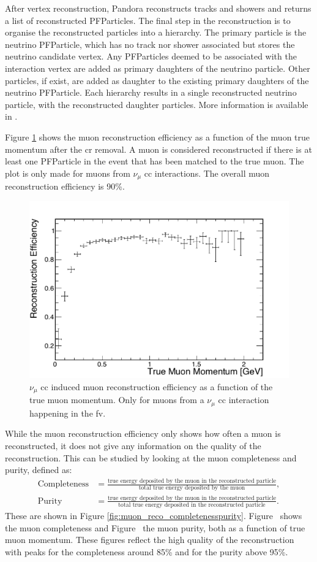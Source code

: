 After vertex reconstruction, Pandora reconstructs tracks and showers and returns a list of reconstructed PFParticles. The final step in the \pn reconstruction is to organise the reconstructed particles into a hierarchy. The primary particle is the neutrino PFParticle, which has no track nor shower associated but stores the neutrino candidate vertex.
Any PFParticles deemed to be associated with the interaction vertex are added as primary daughters of the neutrino particle. Other particles, if exist, are added as daughter to the existing primary daughters of the neutrino PFParticle.
Each hierarchy results in a single reconstructed neutrino particle, with the reconstructed daughter particles. More information is available in \cite{pandora}.

Figure \ref{fig:muon_reco_eff} shows the muon reconstruction efficiency as a function of the muon true momentum after the \acrshort{cr} removal. A muon is considered reconstructed if there is at least one PFParticle in the event that has been matched to the true muon. The plot is only made for muons from $\nu_\mu$ \acrshort{cc} interactions. The overall muon reconstruction efficiency is 90\%.
\begin{figure}[]
\centering
\includegraphics[width=.55\textwidth]{images/muon_reco_eff}
\caption[Muon Reconstruction Efficiency]{$\nu_\mu$ \acrshort{cc} induced muon reconstruction efficiency as a function of the true muon momentum. Only for muons from a $\nu_\mu$ \acrshort{cc} interaction happening in the \acrshort{fv}.}
\label{fig:muon_reco_eff}
\end{figure}

While the muon reconstruction efficiency only shows how often a muon is reconstructed, it does not give any information on the quality of the reconstruction. This can be studied by looking at the  muon completeness and purity, defined as:
\begin{equation}
\begin{split}
\text{Completeness} &= \frac{\text{true energy deposited by the muon in the reconstructed particle}}{\text{total true energy deposited by the muon}}, \\
\text{Purity} &= \frac{\text{true energy deposited by the muon in the reconstructed particle}}{\text{total true energy deposited in the reconstructed particle}}.
\end{split}
\end{equation}
These are shown in Figure \ref{fig:muon_reco_completenesspurity}. Figure~ shows the muon completeness and Figure~ the muon purity, both as a function of true muon momentum. These figures reflect the high quality of the reconstruction with peaks for the completeness around 85\% and for the purity above 95\%.

